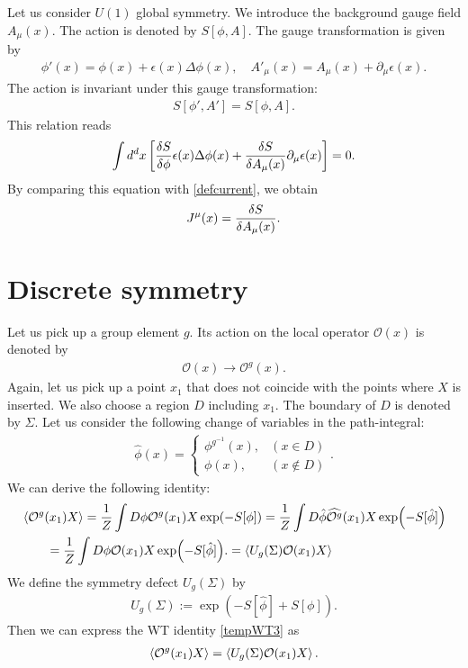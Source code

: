 \documentclass[12pt]{scrartcl}
\newcommand{\del}{\partial}
\newcommand{\Ocal}{\mathcal{O}}
\newcommand{\phih}{\hat{\phi}}
\begin{document}
Let us consider $U(1)$ global symmetry.   We introduce the background gauge field $A_{\mu}(x)$.  The action is denoted by $S[\phi,A]$.
The gauge transformation is given by
\begin{align}
    \phi'(x)=\phi(x)+\epsilon(x)\Delta \phi(x),\quad
    A'_{\mu}(x)=A_{\mu}(x)+\del_{\mu}\epsilon(x).
\end{align}
The action is invariant under this gauge transformation:
\begin{align}
    S[\phi',A']=S[\phi,A].
\end{align}
This relation reads
\begin{align}
    \int d^dx\left[
        \fdv{S}{\phi}\epsilon(x)\Delta \phi(x)
        +\fdv{S}{A_{\mu}(x)}\del_{\mu}\epsilon(x)
    \right]=0.
\end{align}
By comparing this equation with \eqref{defcurrent}, we obtain
\begin{align}
    J^{\mu}(x)=\fdv{S}{A_{\mu}(x)}.
\end{align}

\section{Discrete symmetry}
Let us pick up a group element $g$. Its action on the local operator $\Ocal(x)$ is denoted by
\begin{align}
    \Ocal(x)\to \Ocal^g(x).
\end{align}
Again, let us pick up a point $x_1$ that does not coincide with the points where $X$ is inserted.  We also choose a region $D$ including $x_1$.  The boundary of $D$ is denoted by $\Sigma$.  Let us consider the following change of variables in the path-integral:
\begin{align}
    \phih(x)=
    \begin{cases}
        \phi^{g^{-1}}(x),& (x\in D)\\
        \phi(x),& (x\notin D)
    \end{cases}.
\end{align}
We can derive the following identity:
\begin{align}
    &\expval{\Ocal^{g}(x_1) X}
    =\frac{1}{Z}\int D\phi \Ocal^{g}(x_1) X \exp(-S[\phi])
    =\frac{1}{Z}\int D\phih \widehat{\Ocal^{g}}(x_1) X \exp(-S[\phih])\nonumber\\    
    &\qquad =\frac{1}{Z}\int D\phi \Ocal(x_1) X \exp(-S[\phih]).
    \label{tempWT3}
    =\expval{U_{g}(\Sigma)\Ocal(x_1)X}
\end{align}
We define the symmetry defect $U_{g}(\Sigma)$ by
\begin{align}
    U_{g}(\Sigma):=\exp(-S[\phih]+S[\phi]).\label{symmetryoperator}
\end{align}
Then we can express the WT identity \eqref{tempWT3} as
\begin{align}
    \expval{\Ocal^{g}(x_1)X}
    =\expval{U_{g}(\Sigma)\Ocal(x_1)X}.
\end{align}
\end{document}
